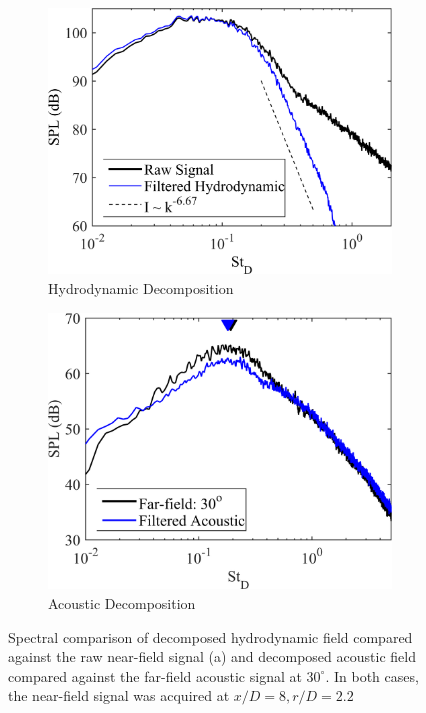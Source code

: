 \begin{figure}
	\centering
	\begin{subfigure}{.5\textwidth}
		\centering
		\includegraphics[width=0.95\linewidth]{Figures/ch3_validation_spectra_hydrodynamic}
		\caption{Hydrodynamic Decomposition}
		\label{fig:ch3_validation_spectra_hydro}
	\end{subfigure}%
	\begin{subfigure}{.5\textwidth}
		\centering
		\includegraphics[width=0.95\linewidth]{Figures/ch3_validation_spectra_acoustic}
		\caption{Acoustic Decomposition}
		\label{fig:ch3_validation_spectra_acoustic}
	\end{subfigure}
	\caption{Spectral comparison of decomposed hydrodynamic field compared against the raw near-field signal (a) and decomposed acoustic field compared against the far-field acoustic signal at $30^\circ$. In both cases, the near-field signal was acquired at $x/D = 8, r/D = 2.2$}
	\label{fig:ch3_validation_spectra}
\end{figure}

